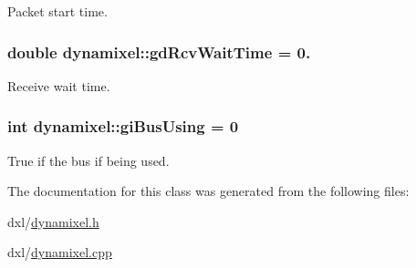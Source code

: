 Packet start time. 

\hypertarget{classdynamixel_a9f47887864517d74955a2bc787ae4456}{}
\subsubsection[{gd\+Rcv\+Wait\+Time}]{\setlength{\rightskip}{0pt plus 5cm}double dynamixel\+::gd\+Rcv\+Wait\+Time = 0.\hspace{0.3cm}{\ttfamily [private]}}\label{classdynamixel_a9f47887864517d74955a2bc787ae4456}


Receive wait time. 

\hypertarget{classdynamixel_ad10e0e49f5fef04bf789a89c14cc470a}{}
\subsubsection[{gi\+Bus\+Using}]{\setlength{\rightskip}{0pt plus 5cm}int dynamixel\+::gi\+Bus\+Using = 0\hspace{0.3cm}{\ttfamily [private]}}\label{classdynamixel_ad10e0e49f5fef04bf789a89c14cc470a}


True if the bus if being used. 



The documentation for this class was generated from the following files\+:\begin{DoxyCompactItemize}
\item 
dxl/\hyperlink{dynamixel_8h}{dynamixel.\+h}\item 
dxl/\hyperlink{dynamixel_8cpp}{dynamixel.\+cpp}\end{DoxyCompactItemize}
